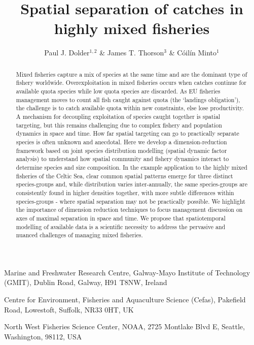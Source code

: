 \documentclass{nature}
\title{Spatial separation of catches in highly mixed fisheries}
\author{Paul J. Dolder$^{1,2}$ \& James T. Thorson$^3$ \& Cóilín Minto$^1$}
\begin{document}
\maketitle

\begin{affiliations}
\item Marine and Freshwater Research Centre, Galway-Mayo Institute of
	Technology (GMIT), Dublin Road, Galway, H91 T8NW, Ireland 
\item Centre for Environment, Fisheries and Aquaculture Science (Cefas),
	Pakefield Road, Lowestoft, Suffolk, NR33 0HT, UK
\item North West Fisheries Science Center, NOAA, 2725 Montlake Blvd E, Seattle,
	Washington, 98112, USA
\end{affiliations}


\begin{abstract} 
Mixed fisheries capture a mix of species at the same time and are the dominant
type of fishery worldwide.  Overexploitation in mixed fisheries occurs when
catches continue for available quota species while low quota species are
discarded\cite{Batsleer2015}. As EU fisheries management moves to count all fish
caught against quota (the `landings obligation'), the challenge is to catch
available quota within new constraints, else lose productivity.  
A mechanism for decoupling exploitation of species caught together is spatial
targeting, but this remains challenging due to complex fishery and population
dynamics in space and time\cite{Branch2008, Dunn2014a}. 
How far spatial targeting can go to practically separate species is often
unknown and anecdotal.
Here we develop a dimension-reduction framework based on joint species
distribution modelling (spatial dynamic factor analysis) to understand how
spatial community and fishery dynamics interact to determine species and size
composition.  
In the example application to the highly mixed fisheries of the Celtic Sea,
clear common spatial patterns emerge for three distinct species-groups and,
while distribution varies inter-annually, the same species-groups are
consistently found in higher densities together, with more subtle differences
within species-groups - where spatial separation may not be practically
possible. 
We highlight the importance of dimension reduction techniques to focus
management discussion on axes of maximal separation in space and time. We
propose that spatiotemporal modelling of available data is a scientific
necessity to address the pervasive and nuanced challenges of managing mixed
fisheries.  
\end{abstract}
\end{document}
